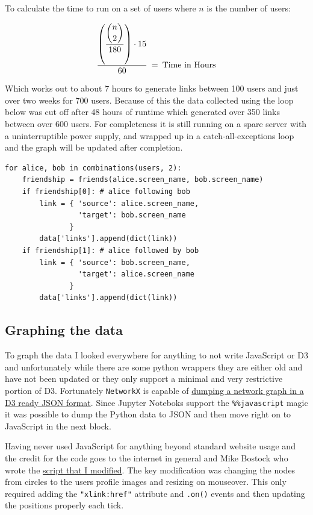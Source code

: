 \documentclass[12pt, a4paper]{article}
\newcommand{\code}[1]{\texttt{#1}}
\begin{document}
\newpage
\noindent
To calculate the time to run on a set of users where $n$ is the number of users:

$$
    \dfrac{\left(\dfrac{\dbinom{n}{2}}{180}\right)\cdot15}{60}\:=\: \text{Time in Hours}
$$

\noindent
Which works out to about 7 hours to generate links between 100 users and just over two weeks for 700 users. Because of this the data collected using the loop below was cut off after 48 hours of runtime which generated over 350 links between over 600 users. For completeness it is still running on a spare server with a uninterruptible power supply, and wrapped up in a catch-all-exceptions loop and the graph will be updated after completion.

\begin{minipage}{\linewidth} %
\vspace{2em}
\begin{verbatim}
for alice, bob in combinations(users, 2):
    friendship = friends(alice.screen_name, bob.screen_name)
    if friendship[0]: # alice following bob
        link = { 'source': alice.screen_name,
                 'target': bob.screen_name
               }
        data['links'].append(dict(link))
    if friendship[1]: # alice followed by bob
        link = { 'source': bob.screen_name,
                 'target': alice.screen_name
               }
        data['links'].append(dict(link))
\end{verbatim}
\vspace{2em}
\end{minipage}


\newpage
\subsection{Graphing the data}

To graph the data I looked everywhere for anything to not write JavaScript or D3 and unfortunately while there are some python wrappers they are either old and have not been updated or they only support a minimal and very restrictive portion of D3. Fortunately \code{NetworkX} is capable of \href{https://networkx.github.io/documentation/networkx-1.10/reference/readwrite.json_graph.html}{dumping a network graph in a D3 ready JSON format}. Since Jupyter Noteboks support the \code{\%\%javascript} magic it was possible to dump the Python data to JSON and then move right on to JavaScript in the next block.

Having never used JavaScript for anything beyond standard website usage and the credit for the code goes to the internet in general and Mike Bostock who wrote the \href{http://mbostock.github.com/d3/ex/force.html}{script that I modified}. The key modification was changing the nodes from circles to the users profile images and resizing on mouseover. This only required adding the \code{"xlink:href"} attribute and \code{.on()} events and then updating the positions properly each tick.
\end{document}
